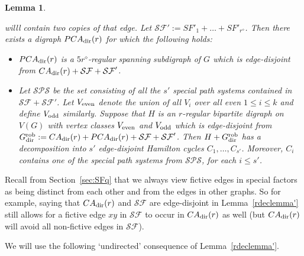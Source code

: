 \documentclass{memo-l}
\newtheorem{lemma}[firstthm]{Lemma}
\numberwithin{section}{chapter}
\numberwithin{equation}{section}
\numberwithin{firstthm}{section}
\numberwithin{figure}{section}
\begin{document}
{\begin{lemma}
\begin{itemize}
{willl contain two copies of that edge.} 
Let $\mathcal{SF}':=SF'_1+\dots +SF'_{r^\diamond}$.
Then there exists a digraph $PCA_{{\rm dir}}(r)$ for which the following holds:
\begin{itemize}
\item[\rm (a)] $PCA_{{\rm dir}}(r)$ is a $5r^\diamond$-regular spanning subdigraph of $G$ which
is edge-disjoint from $CA_{{\rm dir}}(r)+ \mathcal{SF}+ \mathcal{SF}'$.
\item[\rm (b)] Let $\mathcal{SPS}$ be the set consisting of all the $s'$ special path systems
contained in $\mathcal{SF}+ \mathcal{SF}'$. Let $V_{\rm even}$ denote the union of all $V_i$ over all even $1\le i\le k$
and define $V_{\rm odd}$ similarly.
Suppose that $H$ is an $r$-regular bipartite digraph on $V(G)$ with vertex classes $V_{\rm even}$ and $V_{\rm odd}$
which is edge-disjoint from $G^{\rm rob}_{\rm dir}:=CA_{{\rm dir}}(r)+ PCA_{{\rm dir}}(r)+ \mathcal{SF}+ \mathcal{SF}'$.
Then $H+G^{\rm rob}_{\rm dir}$ has a decomposition into $s'$
edge-disjoint Hamilton cycles $C_1,\dots,C_{s'}$.
Moreover, $C_i$ contains one of the special path systems from $\mathcal{SPS}$, for each $i\le s'$.
\end{itemize}
\end{itemize}
\end{lemma}



Recall from Section~\ref{sec:SFq} that we always view fictive edges in special factors as being distinct from each other and
from the edges in other graphs. So for example, saying that $CA_{{\rm dir}}(r)$ and $\mathcal{SF}$ are edge-disjoint in
Lemma~\ref{rdeclemma'} still allows for a fictive edge $xy$ in $\mathcal{SF}$ to occur in $CA_{{\rm dir}}(r)$ as well
(but $CA_{{\rm dir}}(r)$ will avoid all non-fictive edges in $\mathcal{SF}$).
 
We will use the following `undirected' consequence of Lemma~\ref{rdeclemma'}.

}
\end{document}
